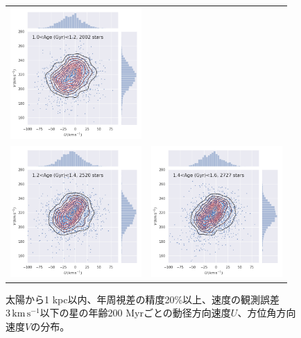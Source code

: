 \begin{figure}[htbp]
\begin{tabular}{cc}
\includegraphics[width=5cm]{fig/UV/1to1.2Gyr_z0.1kpc_hist2d.png}\\
\includegraphics[width=5cm]{fig/UV/1.2to1.4Gyr_z0.1kpc_hist2d.png}&
\includegraphics[width=5cm]{fig/UV/1.4to1.6Gyr_z0.1kpc_hist2d.png}\\
\end{tabular}
    \caption{太陽から1 kpc以内、年周視差の精度20\%以上、速度の観測誤差$3\,\mathrm{km\,s^{-1}}$以下の星の年齢200 Myrごとの動径方向速度$U$、方位角方向速度$V$の分布。}
    \label{hist_UV_200Myr}
\end{figure}

